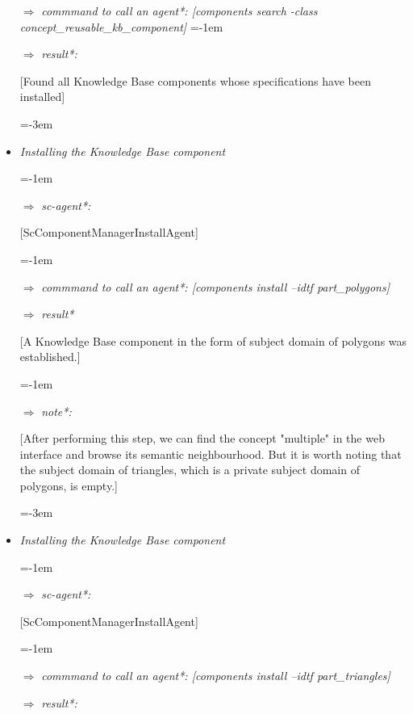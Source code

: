 \documentclass{article}
\begin{document}
\begin{multicols}{2}
\begin{itemize}
\sloppy
\item[$\Rightarrow$] \quad
\textit{commmand to call an agent*: 
[components search -class concept\_reusable\_kb\_component]} 
     \leftskip=-1em
\item[$\Rightarrow$] \quad
\textit{result*:} \par 
      \leftskip=0pt
[Found all Knowledge Base components 
 whose specifications have been installed] \par
\leftskip=-3em
 \item\quad\textit{ Installing the Knowledge Base component} \par
  \leftskip=0pt
  \leftskip=-1em
 \item[$\Rightarrow$] \quad
 \textit{sc-agent*:} \par
   \leftskip=0pt
 [ScComponentManagerInstallAgent] \par
 \leftskip=-1em
 \item[$\Rightarrow$] \quad
 \textit{commmand to call an agent*:
[components install --idtf
part\_polygons]} \par
 \item[$\Rightarrow$] \quad
 \textit{result*} \par
 \leftskip=0pt
 [A Knowledge Base component in
the form of subject domain of
polygons was established.] \par
\leftskip=-1em
\item[$\Rightarrow$] \quad
\textit{note*:} \par
\leftskip=0pt
[After performing this step, we
can find the concept "multiple"
in the web interface and browse
its semantic neighbourhood. But
it is worth noting that the subject
domain of triangles, which is a
private subject domain of polygons, is empty.] \par
\leftskip=-3em
\item\quad\textit{Installing the Knowledge Base component} \par
\leftskip=-1em
\item[$\Rightarrow$] \quad
\textit{sc-agent*:} \par
\leftskip=0pt
[ScComponentManagerInstallAgent] \par
\leftskip=-1em
\item[$\Rightarrow$] \quad
\textit{commmand to call an agent*:
[components install --idtf
part\_triangles]} 
\item[$\Rightarrow$] \quad
\textit{result*:} \par

\end{itemize}
\end{multicols}
\end{document}
